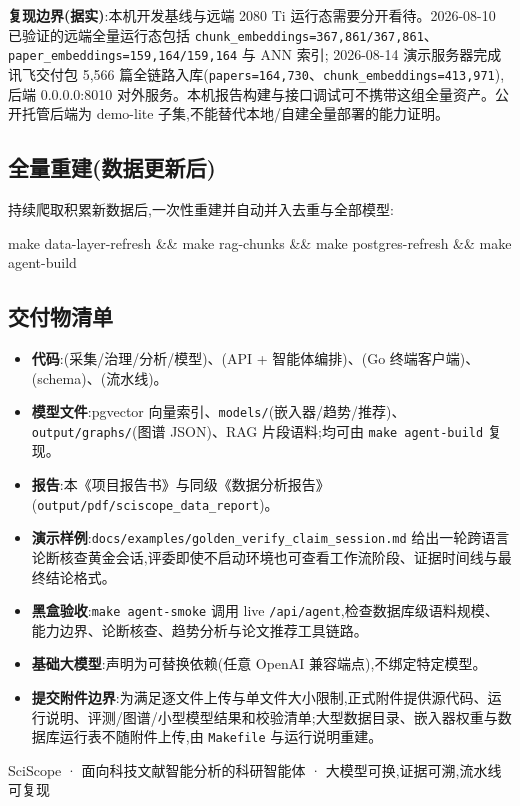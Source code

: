 \begin{plainbox}
\textbf{复现边界(据实)}:本机开发基线与远端 2080 Ti 运行态需要分开看待。2026-08-10 已验证的远端全量运行态包括
\texttt{chunk\_embeddings=367{,}861/367{,}861}、\texttt{paper\_embeddings=159{,}164/159{,}164} 与 ANN 索引; 2026-08-14 演示服务器完成讯飞交付包 5{,}566 篇全链路入库(\texttt{papers=164{,}730}、\texttt{chunk\_embeddings=413{,}971}),后端 0.0.0.0:8010 对外服务。本机报告构建与接口调试可不携带这组全量资产。公开托管后端为 demo-lite 子集,不能替代本地/自建全量部署的能力证明。
\end{plainbox}

\subsection{全量重建(数据更新后)}
持续爬取积累新数据后,一次性重建并自动并入去重与全部模型:
\begin{codepanel}\ttfamily\small
make data-layer-refresh \&\& make rag-chunks \&\& make postgres-refresh \&\& make agent-build
\end{codepanel}

\subsection{交付物清单}
\begin{itemize}
\item \textbf{代码}:(采集/治理/分析/模型)、(API + 智能体编排)、(Go 终端客户端)、(schema)、(流水线)。
\item \textbf{模型文件}:pgvector 向量索引、\texttt{models/}(嵌入器/趋势/推荐)、\texttt{output/graphs/}(图谱 JSON)、RAG 片段语料;均可由 \texttt{make agent-build} 复现。
\item \textbf{报告}:本《项目报告书》与同级《数据分析报告》(\texttt{output/pdf/sciscope\_data\_report})。
\item \textbf{演示样例}:\texttt{docs/examples/golden\_verify\_claim\_session.md} 给出一轮跨语言论断核查黄金会话,评委即使不启动环境也可查看工作流阶段、证据时间线与最终结论格式。
\item \textbf{黑盒验收}:\texttt{make agent-smoke} 调用 live \texttt{/api/agent},检查数据库级语料规模、能力边界、论断核查、趋势分析与论文推荐工具链路。
\item \textbf{基础大模型}:声明为可替换依赖(任意 OpenAI 兼容端点),不绑定特定模型。
\item \textbf{提交附件边界}:为满足逐文件上传与单文件大小限制,正式附件提供源代码、运行说明、评测/图谱/小型模型结果和校验清单;大型数据目录、嵌入器权重与数据库运行表不随附件上传,由 \texttt{Makefile} 与运行说明重建。
\end{itemize}

\vspace{4mm}
\begin{center}\small\color{SciMuted}
SciScope · 面向科技文献智能分析的科研智能体 · 大模型可换,证据可溯,流水线可复现
\end{center}
